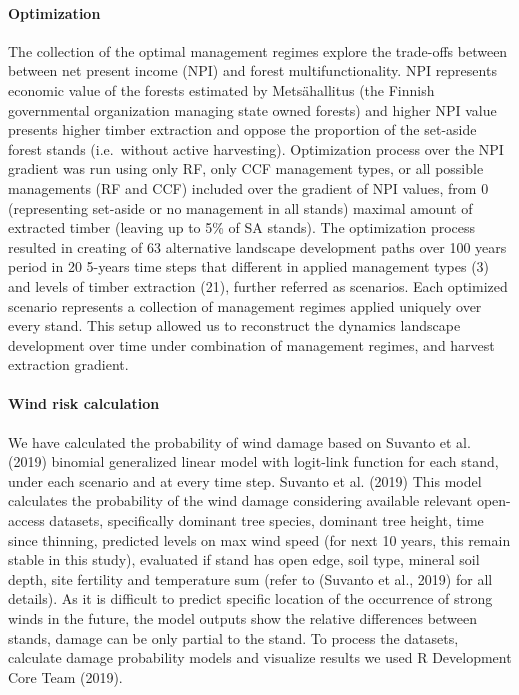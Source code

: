 \documentclass[]{elsarticle} %
\begin{document}
\paragraph{Optimization}\label{optimization}

The collection of the optimal management regimes explore the trade-offs
between between net present income (NPI) and forest multifunctionality.
NPI represents economic value of the forests estimated by Metsähallitus
(the Finnish governmental organization managing state owned forests) and
higher NPI value presents higher timber extraction and oppose the
proportion of the set-aside forest stands (i.e.~without active
harvesting). Optimization process over the NPI gradient was run using
only RF, only CCF management types, or all possible managements (RF and
CCF) included over the gradient of NPI values, from 0 (representing
set-aside or no management in all stands) maximal amount of extracted
timber (leaving up to 5\% of SA stands). The optimization process
resulted in creating of 63 alternative landscape development paths over
100 years period in 20 5-years time steps that different in applied
management types (3) and levels of timber extraction (21), further
referred as scenarios. Each optimized scenario represents a collection
of management regimes applied uniquely over every stand. This setup
allowed us to reconstruct the dynamics landscape development over time
under combination of management regimes, and harvest extraction
gradient.

\paragraph{Wind risk calculation}\label{wind-risk-calculation}

We have calculated the probability of wind damage based on Suvanto et
al. (2019) binomial generalized linear model with logit-link function
for each stand, under each scenario and at every time step. Suvanto et
al. (2019) This model calculates the probability of the wind damage
considering available relevant open-access datasets, specifically
dominant tree species, dominant tree height, time since thinning,
predicted levels on max wind speed (for next 10 years, this remain
stable in this study), evaluated if stand has open edge, soil type,
mineral soil depth, site fertility and temperature sum (refer to
(Suvanto et al., 2019) for all details). As it is difficult to predict
specific location of the occurrence of strong winds in the future, the
model outputs show the relative differences between stands, damage can
be only partial to the stand. To process the datasets, calculate damage
probability models and visualize results we used R Development Core Team
(2019).
\end{document}
